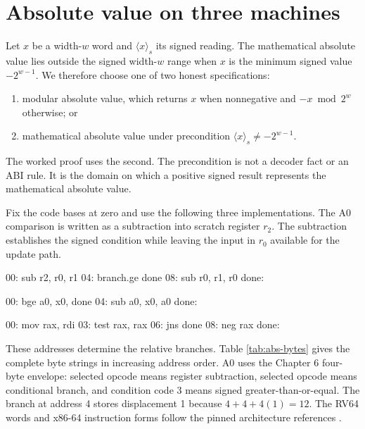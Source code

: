 \section{Absolute value on three machines}

Let \(x\) be a width-\(w\) word and \(\langle x\rangle_s\) its signed reading.
The mathematical absolute value lies outside the signed width-\(w\) range when
\(x\) is the minimum signed value \(-2^{w-1}\). We therefore choose one of two
honest specifications:

\begin{enumerate}
\item modular absolute value, which returns \(x\) when nonnegative and
\(-x\bmod 2^w\) otherwise; or
\item mathematical absolute value under precondition
\(\langle x\rangle_s\ne-2^{w-1}\).
\end{enumerate}

The worked proof uses the second. The precondition is not a decoder fact or an
ABI rule. It is the domain on which a positive signed result represents the
mathematical absolute value.

Fix the code bases at zero and use the following three implementations. The
A0 comparison is written as a subtraction into scratch register \(r_2\). The
subtraction establishes the signed condition while leaving the input in
\(r_0\) available for the update path.

\begin{codelisting}[language={},caption={A0 absolute value, with r1 initialized to zero}]
00: sub       r2, r0, r1
04: branch.ge done
08: sub       r0, r1, r0
done:
\end{codelisting}

\begin{codelisting}[language={},caption={RV64I absolute value}]
00: bge  a0, x0, done
04: sub  a0, x0, a0
done:
\end{codelisting}

\begin{codelisting}[language={},caption={x86-64 absolute value in the selected local contract}]
00: mov  rax, rdi
03: test rax, rax
06: jns  done
08: neg  rax
done:
\end{codelisting}

These addresses determine the relative branches. Table
\ref{tab:abs-bytes} gives the complete byte strings in increasing address
order. A0 uses the Chapter 6 four-byte envelope: selected opcode 
means register subtraction, selected opcode  means conditional
branch, and condition code 3 means signed greater-than-or-equal. The branch at
address 4 stores displacement 1 because \(4+4+4(1)=12\). The RV64 words and
x86-64 instruction forms follow the pinned architecture references
\autocite{riscv2026unpriv,intel2026sdm2}.

